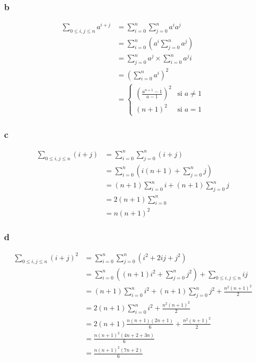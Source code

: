\documentclass{report}
\begin{document}
\subsubsection*{b}
\begin{equation*}
	\begin{split}
		\sum_{0 \le i,j \le n} a^{i+j} &= \sum_{i=0}^{n} \sum_{j=0}^{n} a^i a^j \\
			&= \sum_{i=0}^{n} \left(a^i \sum_{j=0}^{n} a^j \right)\\
			&= \sum_{j=0}^{n} a^j \times \sum_{i=0}^{n} a^ji \\
			&= \left(\sum_{i=0}^{n} a^i \right)^2 \\
			&= \begin{cases}
				\left(\frac{a^{n+1}-1}{a-1}\right)^2 & \text{si $a\neq 1$}\\
				(n+1)^2                                  & \text{si $a= 1$}
				\end{cases}          
	\end{split}
\end{equation*}

\subsubsection*{c}
\begin{equation*}
	\begin{split}
		\sum_{0 \le i,j \le n} (i+j) &= \sum_{i=0}^{n} \sum_{j=0}^{n} (i+j) \\
		&= \sum_{i=0}^{n} \left(i(n+1) + \sum_{j=0}^{n} j \right)\\
		&= (n+1) \sum_{i=0}^{n} i + (n+1)\sum_{j=0}^{n} j  \\
		&= 2(n+1) \sum_{i=0}^{n} \\
		&= n(n+1)^2
	\end{split}
\end{equation*}

\subsubsection*{d}
\begin{equation*}
	\begin{split}
		\sum_{0 \le i,j \le n} (i+j)^2 &= \sum_{i=0}^{n} \sum_{j=0}^{n} (i^2+2ij+j^2) \\
		&= \sum_{i=0}^{n} \left((n+1)i^2 + \sum_{j=0}^{n} j^2 \right) + \sum_{0 \le i,j \le n} ij\\
		&= (n+1) \sum_{i=0}^{n} i^2 + (n+1)\sum_{j=0}^{n} j^2 + \frac{n^2(n+1)^2}{2}  \\
		&= 2(n+1) \sum_{i=0}^{n} i^2 + \frac{n^2(n+1)^2}{2} \\
		&= 2(n+1)\frac{n(n+1)(2n+1)}{6} + \frac{n^2(n+1)^2}{2} \\
		&= \frac{n(n+1)^2(4n+2+3n)}{6} \\
		&= \frac{n(n+1)^2(7n+2)}{6}
	\end{split}
\end{equation*}
\end{document}
